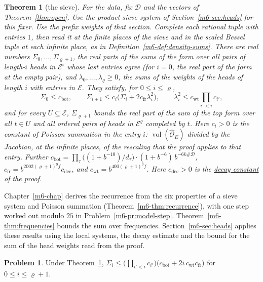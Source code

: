 \documentclass[reqno]{amsart}
\newcounter{chap}
\theoremstyle{definition}
\newtheorem{problem}{Problem}[section]
\theoremstyle{plain}
\newtheorem{theorem}{Theorem}[section]
\theoremstyle{remark}
\newcommand{\Dc}{\mathcal{D}}
\newcommand{\Oh}{\hat{\mathcal O}_E}
\newcommand{\vol}{\operatorname{vol}}
\newcommand{\glsrc}[3]{\href{https://github.com/lsernau/grh-lean/blob/72fead1/grh/src/#1\#L#2}{#3}}
\begin{document}
\begin{theorem}[the sieve]\label{thm:sieve}
For the data, fix \(\Dc\) and the vectors of Theorem~\ref{thm:open}.  Use the product sieve system of Section~\ref{m6-sec:heads} for this fixer.  Use the prefix weights of that section.  Complete each rational tuple with entries \(1\), then read it at the finite places of the sieve and in the scaled Bessel tuple at each infinite place, as in Definition~\ref{m6-def:density-sums}.  There are real numbers \(\Sigma_0,\dots,\Sigma_{\varrho+1}\), the real parts of the sums of the form over all pairs of length-\(i\) heads in \(\mathcal E^i\) whose last entries agree (for \(i=0\), the real part of the form at the empty pair), and \(\lambda_0,\dots,\lambda_\varrho\ge0\), the sums of the weights of the heads of length \(i\) with entries in \(\mathcal E\).  They satisfy, for \(0\le i\le\varrho\),
\[
 \Sigma_0\le c_{\mathrm{bot}},\qquad \Sigma_{i+1}\le c_i\bigl(\Sigma_i+2c_{\mathrm{fr}}\lambda_i^2\bigr),\qquad \lambda_i^2\le c_{\mathrm{wt}}\prod_{i'<i}c_{i'} ,
\]
and for every \(U\subseteq\mathcal E\), \(\Sigma_{\varrho+1}\) bounds the real part of the sum of the top form over all \(t\in U\) and all ordered pairs of heads in \(\mathcal E^\varrho\) completed by \(t\).  Here \(c_i>0\) is the constant of Poisson summation in the entry \(i\): \(\vol(\Oh)\) divided by the Jacobian, at the infinite places, of the rescaling that the proof applies to that entry.  Further \(c_{\mathrm{bot}}=\prod_\tau\bigl((1+b^{-10})/d_\tau\bigr)\cdot(1+b^{-6})\,b^{-6k\#\Dc}\), \(c_{\mathrm{fr}}=b^{2002(\varrho+1)^9f}c_{\mathrm{dec}}\), and \(c_{\mathrm{wt}}=b^{400(\varrho+1)^9f}\).  Here \(c_{\mathrm{dec}}>0\) is the \glsrc{New/Spanning/MainTerm/GlobalSieve.lean}{800}{decay constant} of the proof.
\end{theorem}

Chapter~\ref{m6-chap} derives the recurrence from the six properties of a sieve system and Poisson summation (Theorem~\ref{m6-thm:recurrence}), with one step worked out modulo \(25\) in Problem~\ref{m6-pr:model-step}.  Theorem~\ref{m6-thm:frequencies} bounds the sum over frequencies.  Section~\ref{m6-sec:heads} applies these results using the local systems, the decay estimate and the bound for the sum of the head weights read from the proof.

\begin{problem}\label{pr:induction}
Under Theorem~\ref{thm:sieve}, \(\Sigma_i\le\bigl(\prod_{i'<i}c_{i'}\bigr)\bigl(c_{\mathrm{bot}}+2i\,c_{\mathrm{wt}}c_{\mathrm{fr}}\bigr)\) for \(0\le i\le\varrho+1\).
\end{problem}
\end{document}
